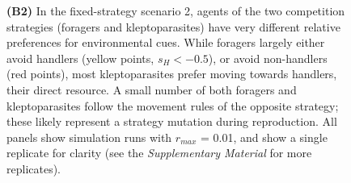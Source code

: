 \begin{figure}[h!]
{            \textbf{(B2)} In the fixed-strategy scenario 2, agents of the two competition strategies (foragers and kleptoparasites) have very different relative preferences for environmental cues.
            While foragers largely either avoid handlers (yellow points, $s_H < -0.5$), or avoid non-handlers (red points), most kleptoparasites prefer moving towards handlers, their direct resource.
            A small number of both foragers and kleptoparasites follow the movement rules of the opposite strategy; these likely represent a strategy mutation during reproduction.
            All panels show simulation runs with $r_{max}$ = 0.01, and show a single replicate for clarity (see the \textit{Supplementary Material} for more replicates).
        }
        \label{fig1}
    \end{figure}
    
